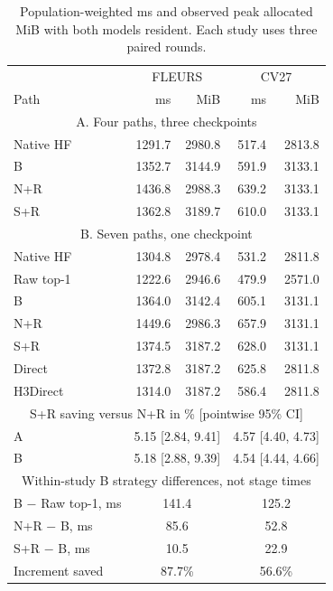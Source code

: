 \begin{table}[!t]\centering\footnotesize
\caption{Population-weighted ms and observed peak allocated MiB with both models resident. Each study uses three paired rounds.}\label{tab:cost}
\setlength{\tabcolsep}{4pt}\renewcommand{\arraystretch}{1.00}
\begin{tabular}{@{}lrrrr@{}}\toprule
 & \multicolumn{2}{c}{FLEURS} & \multicolumn{2}{c}{CV27}\\
Path & ms & MiB & ms & MiB\\\midrule
\multicolumn{5}{c}{A. Four paths, three checkpoints}\\
Native HF & 1291.7 & 2980.8 & 517.4 & 2813.8\\
B & 1352.7 & 3144.9 & 591.9 & 3133.1\\
N+R & 1436.8 & 2988.3 & 639.2 & 3133.1\\
S+R & 1362.8 & 3189.7 & 610.0 & 3133.1\\
\midrule
\multicolumn{5}{c}{B. Seven paths, one checkpoint}\\
Native HF & 1304.8 & 2978.4 & 531.2 & 2811.8\\
Raw top-1 & 1222.6 & 2946.6 & 479.9 & 2571.0\\
B & 1364.0 & 3142.4 & 605.1 & 3131.1\\
N+R & 1449.6 & 2986.3 & 657.9 & 3131.1\\
S+R & 1374.5 & 3187.2 & 628.0 & 3131.1\\
Direct & 1372.8 & 3187.2 & 625.8 & 2811.8\\
H3Direct & 1314.0 & 3187.2 & 586.4 & 2811.8\\
\midrule
\multicolumn{5}{c}{S+R saving versus N+R in \% [pointwise 95\% CI]}\\
A & \multicolumn{2}{c}{5.15 [2.84, 9.41]} & \multicolumn{2}{c}{4.57 [4.40, 4.73]}\\
B & \multicolumn{2}{c}{5.18 [2.88, 9.39]} & \multicolumn{2}{c}{4.54 [4.44, 4.66]}\\
\midrule
\multicolumn{5}{c}{Within-study B strategy differences, not stage times}\\
B $-$ Raw top-1, ms & \multicolumn{2}{c}{141.4} & \multicolumn{2}{c}{125.2}\\
N+R $-$ B, ms & \multicolumn{2}{c}{85.6} & \multicolumn{2}{c}{52.8}\\
S+R $-$ B, ms & \multicolumn{2}{c}{10.5} & \multicolumn{2}{c}{22.9}\\
Increment saved & \multicolumn{2}{c}{87.7\%} & \multicolumn{2}{c}{56.6\%}\\
\bottomrule\end{tabular}\end{table}
